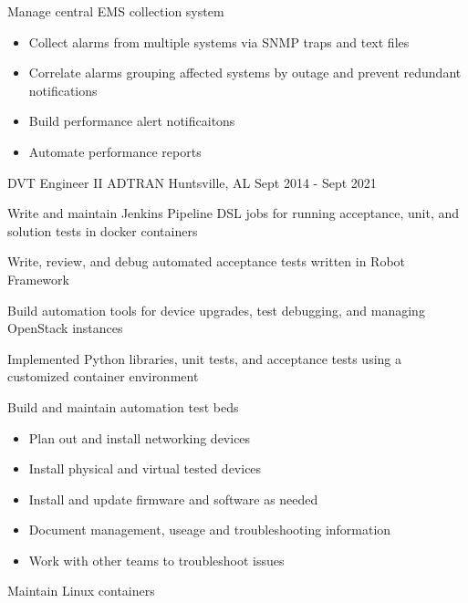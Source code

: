 \begin{cventries}
{\begin{cvitems}
        \item {Manage central EMS collection system}
            \begin{itemize}
                \item {Collect alarms from multiple systems via SNMP traps and text files}
                \item {Correlate alarms grouping affected systems by outage and prevent redundant notifications}
                \item {Build performance alert notificaitons}
                \item {Automate performance reports}
            \end{itemize}
      \end{cvitems}
    }

  \cventry
    {DVT Engineer II} %
    {ADTRAN} %
    {Huntsville, AL} %
    {Sept 2014 - Sept 2021} %
    {
      \begin{cvitems} %
        \item {Write and maintain Jenkins Pipeline DSL jobs for running acceptance, unit, and solution tests in docker containers}
        \item {Write, review, and debug automated acceptance tests written in Robot Framework}
        \item {Build automation tools for device upgrades, test debugging, and managing OpenStack instances}
        \item {Implemented Python libraries, unit tests, and acceptance tests using a customized container environment}
        \item {Build and maintain automation test beds}
            \begin{itemize}
                \item {Plan out and install networking devices}
                \item {Install physical and virtual tested devices}
                \item {Install and update firmware and software as needed}
                \item {Document management, useage and troubleshooting information}
                \item {Work with other teams to troubleshoot issues}
            \end{itemize}
        \item {Maintain Linux containers}
            \begin{itemize}

\end{itemize}
\end{cvitems}}
\end{cventries}
